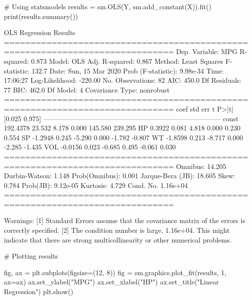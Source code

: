 \begin{python}
# Using statsmodels
results = sm.OLS(Y, sm.add_constant(X)).fit()
print(results.summary())
\end{python}

\begin{console}
                            OLS Regression Results
==============================================================================
Dep. Variable:                    MPG   R-squared:                       0.873
Model:                            OLS   Adj. R-squared:                  0.867
Method:                 Least Squares   F-statistic:                     132.7
Date:                Sun, 15 Mar 2020   Prob (F-statistic):           9.98e-34
Time:                        17:06:27   Log-Likelihood:                -220.00
No. Observations:                  82   AIC:                             450.0
Df Residuals:                      77   BIC:                             462.0
Df Model:                           4
Covariance Type:            nonrobust
==============================================================================
                 coef    std err          t      P>|t|      [0.025      0.975]
------------------------------------------------------------------------------
const        192.4378     23.532      8.178      0.000     145.580     239.295
HP             0.3922      0.081      4.818      0.000       0.230       0.554
SP            -1.2948      0.245     -5.290      0.000      -1.782      -0.807
WT            -1.8598      0.213     -8.717      0.000      -2.285      -1.435
VOL           -0.0156      0.023     -0.685      0.495      -0.061       0.030
==============================================================================
Omnibus:                       14.205   Durbin-Watson:                   1.148
Prob(Omnibus):                  0.001   Jarque-Bera (JB):               18.605
Skew:                           0.784   Prob(JB):                     9.12e-05
Kurtosis:                       4.729   Cond. No.                     1.16e+04
==============================================================================

Warnings:
[1] Standard Errors assume that the covariance matrix of the errors is correctly
specified.
[2] The condition number is large, 1.16e+04. This might indicate that there are
strong multicollinearity or other numerical problems.
\end{console}

\begin{python}
# Plotting results

fig, ax = plt.subplots(figsize=(12, 8))
fig = sm.graphics.plot_fit(results, 1, ax=ax)
ax.set_ylabel("MPG")
ax.set_xlabel("HP")
ax.set_title("Linear Regression")
plt.show()
\end{python}

